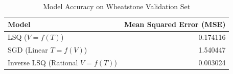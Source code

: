 \begin{table}[H]
\centering
\caption{Model Accuracy on Wheatstone Validation Set}
\label{table:wheatstone_validation_accuracy_table}
\begin{tabular}{lr}
\toprule
 Model & Mean Squared Error (MSE) \\
\midrule
 LSQ ($V=f(T)$) & 0.174116 \\
 SGD (Linear $T=f(V)$) & 1.540447 \\
 Inverse LSQ (Rational $V=f(T)$) & 0.003024 \\
\bottomrule
\end{tabular}
\end{table}
